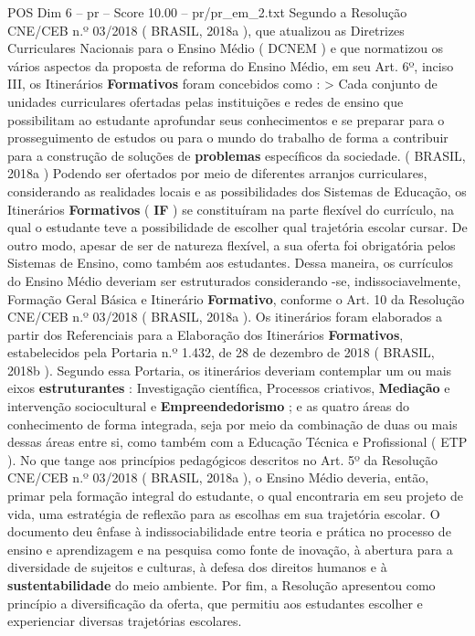 \begin{textsample}{POS Dim 6 – pr – Score 10.00 – pr/pr\_em\_2.txt}
Segundo a Resolução CNE/CEB n.º 03/2018 ( BRASIL, 2018a ), que atualizou as Diretrizes Curriculares Nacionais para o Ensino Médio ( DCNEM ) e que normatizou os vários aspectos da proposta de reforma do Ensino Médio, em seu Art. 6º, inciso III, os Itinerários \textbf{Formativos} foram concebidos como : > Cada conjunto de unidades curriculares ofertadas pelas instituições e redes de ensino que possibilitam ao estudante aprofundar seus conhecimentos e se preparar para o prosseguimento de estudos ou para o mundo do trabalho de forma a contribuir para a construção de soluções de \textbf{problemas} específicos da sociedade. ( BRASIL, 2018a ) Podendo ser ofertados por meio de diferentes arranjos curriculares, considerando as realidades locais e as possibilidades dos Sistemas de Educação, os Itinerários \textbf{Formativos} ( \textbf{IF} ) se constituíram na parte flexível do currículo, na qual o estudante teve a possibilidade de escolher qual trajetória escolar cursar.
De outro modo, apesar de ser de natureza flexível, a sua oferta foi obrigatória pelos Sistemas de Ensino, como também aos estudantes.
Dessa maneira, os currículos do Ensino Médio deveriam ser estruturados considerando -se, indissociavelmente, Formação Geral Básica e Itinerário \textbf{Formativo}, conforme o Art. 10 da Resolução CNE/CEB n.º 03/2018 ( BRASIL, 2018a ).
Os itinerários foram elaborados a partir dos Referenciais para a Elaboração dos Itinerários \textbf{Formativos}, estabelecidos pela Portaria n.º 1.432, de 28 de dezembro de 2018 ( BRASIL, 2018b ).
Segundo essa Portaria, os itinerários deveriam contemplar um ou mais eixos \textbf{estruturantes} : Investigação científica, Processos criativos, \textbf{Mediação} e intervenção sociocultural e \textbf{Empreendedorismo} ; e as quatro áreas do conhecimento de forma integrada, seja por meio da combinação de duas ou mais dessas áreas entre si, como também com a Educação Técnica e Profissional ( ETP ).
No que tange aos princípios pedagógicos descritos no Art. 5º da Resolução CNE/CEB n.º 03/2018 ( BRASIL, 2018a ), o Ensino Médio deveria, então, primar pela formação integral do estudante, o qual encontraria em seu projeto de vida, uma estratégia de reflexão para as escolhas em sua trajetória escolar.
O documento deu ênfase à indissociabilidade entre teoria e prática no processo de ensino e aprendizagem e na pesquisa como fonte de inovação, à abertura para a diversidade de sujeitos e culturas, à defesa dos direitos humanos e à \textbf{sustentabilidade} do meio ambiente.
Por fim, a Resolução apresentou como princípio a diversificação da oferta, que permitiu aos estudantes escolher e experienciar diversas trajetórias escolares.

\end{textsample}

